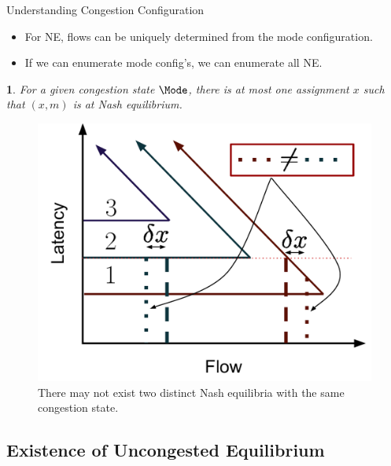 \documentclass[xcolor=svgnames, english, smaller]{beamer}
\theoremstyle{plain}
\theoremstyle{definition}
\theoremstyle{plain}
\newtheorem{lem}[thm]{\protect\lemmaname}
\theoremstyle{plain}
\providecommand{\lemmaname}{Lemma}
\begin{document}
\begin{frame}{Understanding Congestion Configuration}
\begin{itemize}
\item For NE, flows can be uniquely determined from the mode configuration. 
\item If we can enumerate mode config's, we can enumerate all NE.\end{itemize}
\begin{lem}
\label{lem:uniquemode}For a given congestion state $\Mode$, there
is at most one assignment $x$ such that $(x,m)$ is at Nash equilibrium.
\end{lem}
\begin{figure}
\begin{centering}
\includegraphics[scale=0.25]{../../figures/presentation/LemmaUniqueFlowFromMode}
\par\end{centering}

\caption{There may not exist two distinct Nash equilibria with the same congestion
state.}
\end{figure}



\end{frame}

\subsection{Existence of Uncongested Equilibrium}
\end{document}
